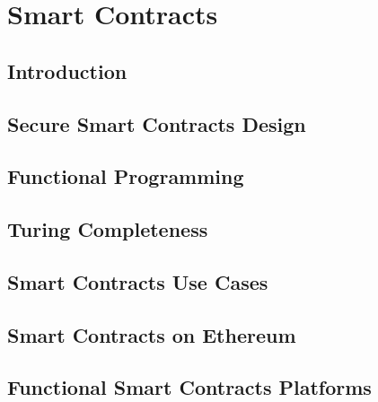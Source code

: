 \chapter{Smart Contracts}\label{chapter::smartcontracts}
	
	\section{Introduction}
	
	\section{Secure Smart Contracts Design}
	
	\section{Functional Programming}
	
	\section{Turing Completeness}
	
	\section{Smart Contracts Use Cases}
	
	\section{Smart Contracts on Ethereum}
	
	\section{Functional Smart Contracts Platforms}